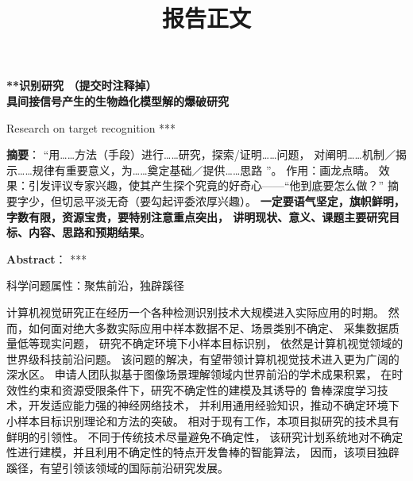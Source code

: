 \documentclass[12pt]{article}
\newcommand{\myEmph}[1]{\textbf{\textcolor[rgb]{0,0,0.25}{#1}}}
\begin{document}
\begin{center}\bf\Large ***识别研究 （提交时注释掉） \\

    具间接信号产生的生物趋化模型解的爆破研究

Research on target recognition *** 
\end{center}





\textbf{摘要}：
%
“用……方法（手段）进行……研究，探索/证明……问题，
对阐明……机制／揭示……规律有重要意义，为……奠定基础／提供……思路 ”。
作用：画龙点睛。
效果：引发评议专家兴趣，使其产生探个究竟的好奇心——“他到底要怎么做？”
摘要字少，但切忌平淡无奇（要勾起评委浓厚兴趣）。
\myEmph{一定要语气坚定，旗帜鲜明，字数有限，资源宝贵，要特别注意重点突出，
讲明现状、意义、课题主要研究目标、内容、思路和预期结果}。



\textbf{Abstract}：
***


科学问题属性：聚焦前沿，独辟蹊径



计算机视觉研究正在经历一个各种检测识别技术大规模进入实际应用的时期。
然而，如何面对绝大多数实际应用中样本数据不足、场景类别不确定、
采集数据质量低等现实问题，
研究不确定环境下小样本目标识别，
依然是计算机视觉领域的世界级科技前沿问题。
%
该问题的解决，有望带领计算机视觉技术进入更为广阔的深水区。
申请人团队拟基于图像场景理解领域内世界前沿的学术成果积累，
在时效性约束和资源受限条件下，研究不确定性的建模及其诱导的
鲁棒深度学习技术，开发适应能力强的神经网络技术，
并利用通用经验知识，推动不确定环境下小样本目标识别理论和方法的突破。
%
相对于现有工作，本项目拟研究的技术具有鲜明的引领性。
不同于传统技术尽量避免不确定性，
该研究计划系统地对不确定性进行建模，并且利用不确定性的特点开发鲁棒的智能算法，
因而，该项目独辟蹊径，有望引领该领域的国际前沿研究发展。


\clearpage


\title{报告正文}

\maketitle





\end{document}
